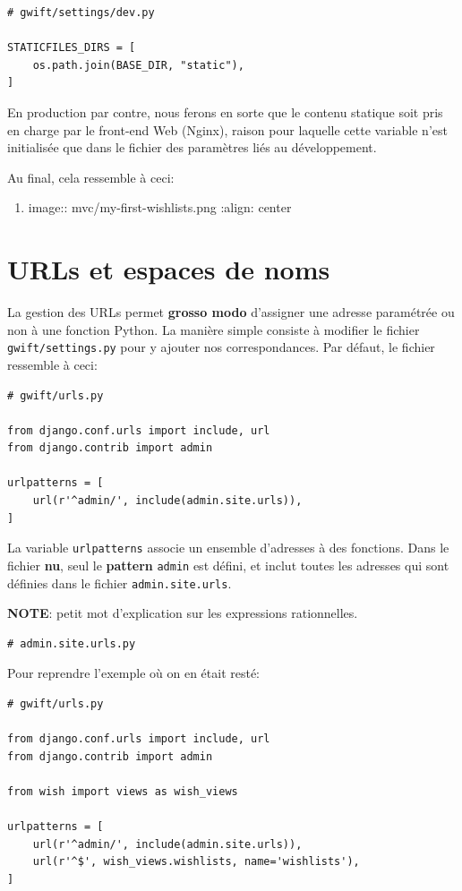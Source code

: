 \documentclass[11pt]{amsbook}
\newcommand{\admonition}[2]{\textbf{#1}: {#2}}
\begin{document}
\begin{verbatim}
# gwift/settings/dev.py

STATICFILES_DIRS = [
    os.path.join(BASE_DIR, "static"),
]
\end{verbatim}

En production par contre, nous ferons en sorte que le contenu statique soit pris en charge par le front-end Web (Nginx), raison pour laquelle cette variable n’est initialisée que dans le fichier des paramètres liés au développement.


Au final, cela ressemble à ceci:


\begin{enumerate}

\item{image:: mvc/my-first-wishlists.png
:align: center}

\end{enumerate}


\hypertarget{x-urls-et-espaces-de-noms}{\chapter{URLs et espaces de noms}}
La gestion des URLs permet \textbf{grosso modo} d’assigner une adresse paramétrée ou non à une fonction Python. La manière simple consiste à modifier le fichier \texttt{gwift/settings.py} pour y ajouter nos correspondances. Par défaut, le fichier ressemble à ceci:


\begin{verbatim}
# gwift/urls.py

from django.conf.urls import include, url
from django.contrib import admin

urlpatterns = [
    url(r'^admin/', include(admin.site.urls)),
]
\end{verbatim}

La variable \texttt{urlpatterns} associe un ensemble d’adresses à des fonctions. Dans le fichier \textbf{nu}, seul le \textbf{pattern} \texttt{admin} est défini, et inclut toutes les adresses qui sont définies dans le fichier \texttt{admin.site.urls}.


\admonition{NOTE}{petit mot d’explication sur les expressions rationnelles.}
\begin{verbatim}
# admin.site.urls.py
\end{verbatim}

Pour reprendre l’exemple où on en était resté:


\begin{verbatim}
# gwift/urls.py

from django.conf.urls import include, url
from django.contrib import admin

from wish import views as wish_views

urlpatterns = [
	url(r'^admin/', include(admin.site.urls)),
	url(r'^$', wish_views.wishlists, name='wishlists'),
]
\end{verbatim}
\end{document}
